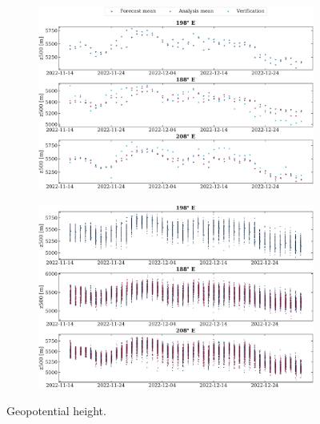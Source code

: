 \documentclass[parskip=half,DIV=16]{scrartcl}
\begin{document}
\begin{figure}[ht]
   \centering

   \begin{subfigure}[c]{\textwidth}
      \includegraphics[width=\textwidth]{figures/height_means.pdf}
   \end{subfigure}
    
   \bigskip
    
   \begin{subfigure}[c]{\textwidth}
      \includegraphics[width=\textwidth]{figures/heights.pdf}
   \end{subfigure}

   \caption{Geopotential height.}
   \label{fig:height}
\end{figure}
\end{document}
